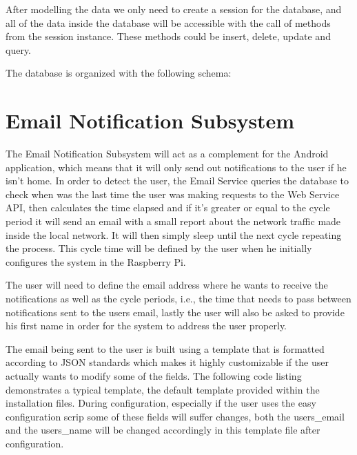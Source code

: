 
After modelling the data we only need to create a session for the database, and
all of the data inside the database will be accessible with the call of methods
from the session instance. These methods could be insert, delete, update and
query.



The database is organized with the following schema:



\section{Email Notification Subsystem}
\label{chap4:sec:email-sys}
The Email Notification Subsystem will act as a complement for the Android
application, which means that it will only send out notifications to the user if
he isn't home. In order to detect the user, the Email Service queries the
database to check when was the last time the user was making requests to the Web
Service API, then calculates the time elapsed and if it's greater or equal to
the cycle period it will send an email with a small report about the network
traffic made inside the local network. It will then simply sleep until the next
cycle repeating the process. This cycle time will be defined by the user when he
initially configures the system in the Raspberry Pi.

The user will need to define the email address where he wants to receive the
notifications as well as the cycle periods, i.e., the time that needs to pass
between notifications sent to the users email, lastly the user will also be
asked to provide his first name in order for the system to address the user
properly.

The email being sent to the user is built using a template that is formatted
according to JSON standards which makes it highly customizable if the user
actually wants to modify some of the fields. The following code listing
demonstrates a typical template, the default template provided within the
installation files. During configuration, especially if the user uses the easy
configuration scrip some of these fields will suffer changes, both the
users\_email and the users\_name will be changed accordingly in this template
file after configuration.

